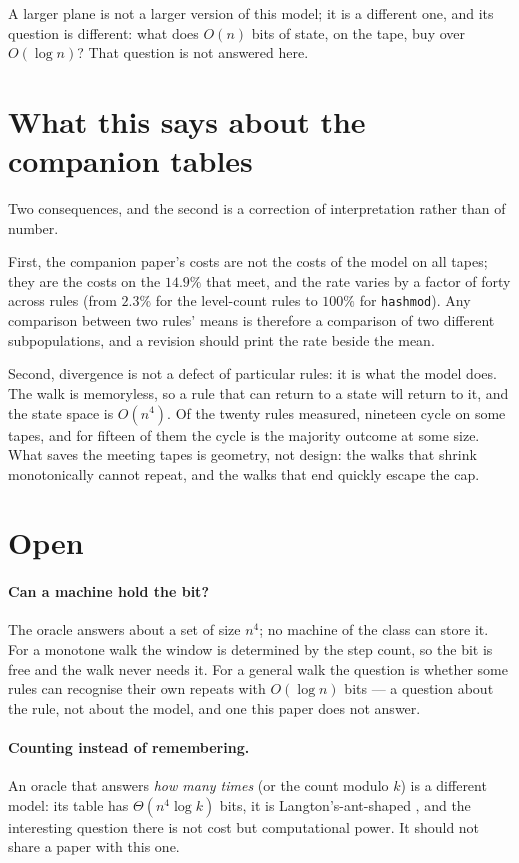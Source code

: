 \documentclass[11pt]{article}
\theoremstyle{remark}
\begin{document}
A larger plane is not a larger version of this model; it is a different one, and its question is different:
what does $O(n)$ bits of state, on the tape, buy over $O(\log n)$?
That question is not answered here.

\section{What this says about the companion tables}

Two consequences, and the second is a correction of interpretation rather than of number.

First, the companion paper's costs are not the costs of the model on all tapes; they are the costs on the
$14.9\%$ that meet, and the rate varies by a factor of forty across rules (from $2.3\%$ for the level-count
rules to $100\%$ for \texttt{hashmod}). Any comparison between two rules' means is therefore a comparison of two
different subpopulations, and a revision should print the rate beside the mean.

Second, divergence is not a defect of particular rules: it is what the model does. The walk is memoryless,
so a rule that can return to a state will return to it, and the state space is $O(n^{4})$. Of the twenty
rules measured, nineteen cycle on some tapes, and for fifteen of them the cycle is the majority outcome at some
size. What saves the meeting tapes is geometry, not design: the walks that shrink monotonically cannot
repeat, and the walks that end quickly escape the cap.

\section{Open}

\paragraph{Can a machine hold the bit?} The oracle answers about a set of size $n^{4}$; no machine of the
class can store it. For a monotone walk the window is determined by the step count, so the bit is free and
the walk never needs it. For a general walk the question is whether some rules can recognise their own
repeats with $O(\log n)$ bits --- a question about the rule, not about the model, and one this paper does not
answer.

\paragraph{Counting instead of remembering.} An oracle that answers \emph{how many times} (or the count
modulo $k$) is a different model: its table has $\Theta(n^{4}\log k)$ bits, it is Langton's-ant-shaped
\citep{langton1986}, and the interesting question there is not cost but computational power. It should not
share a paper with this one.
\end{document}
